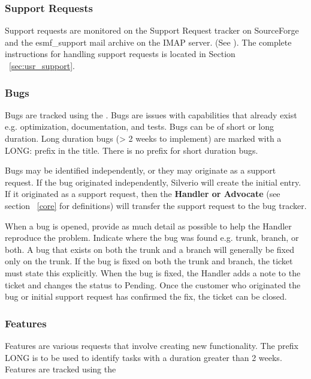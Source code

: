 \subsubsection{Support Requests}

Support requests are monitored on the Support Request tracker on SourceForge and the esmf\_support mail archive on the IMAP server. (See ). The complete instructions for handling support requests is located in Section ~\ref{sec:usr_support}.

\subsubsection{Bugs}

Bugs are tracked using the . Bugs are issues with capabilities that already exist e.g. optimization, documentation, and tests. Bugs can be of short or long duration.  Long duration bugs (> 2 weeks to implement) are marked with a LONG: prefix in the title.  There is no prefix for short duration bugs.

Bugs may be identified independently, or they may originate as a support request. If the bug originated independently, Silverio will create the initial entry. If it originated as a support request, then the {\bf Handler or Advocate} (see section ~\ref{core} for definitions) will transfer the support request to the bug tracker. 

When a bug is opened, provide as much detail as possible to help the Handler reproduce the problem. Indicate where the bug was found e.g. trunk, branch, or both. A bug that exists on both the trunk and a branch will generally be fixed only on the trunk. If the bug is fixed on both the trunk and branch, the ticket must  state this explicitly. When the bug is fixed, the Handler adds a note to the ticket and changes the status to Pending. Once the customer who originated the bug or initial support request has confirmed the fix, the ticket can be closed. 

\subsubsection{Features}

Features are various requests that involve creating new functionality. The prefix LONG is to be used to identify tasks with a duration greater than 2 weeks. Features are tracked using the 

